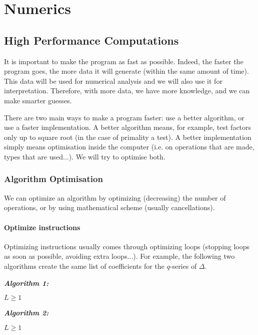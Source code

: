 \section{Numerics}
\subsection{High Performance Computations}
It is important to make the program as fast as possible.
Indeed, the faster the program goes, the more data it will generate (within the same amount of time).
This data will be used for numerical analysis and we will also use it for interpretation.
Therefore, with more data, we have more knowledge, and we can make smarter guesses.

There are two main ways to make a program faster:
use a better algorithm, or 
use a faster implementation.
A better algorithm means, for example, test factors only up to square root (in the case of primality a test).
A better implementation simply means optimisation inside the computer (i.e. on operations that are made, types that are used...).
We will try to optimise both.

\subsubsection{Algorithm Optimisation}
\label{algorithmOptimisation}
We can optimize an algorithm by optimizing (decreasing) the number of operations, or by using mathematical scheme (usually cancellations).
\paragraph{Optimize instructions}
Optimizing instructions usually comes through optimizing loops (stopping loops as soon as possible, avoiding extra loops...).
For example, the following two algorithms create the same list of coefficients for the $q$-series of $\Delta$.

\textbf{\textit{Algorithm 1:}}
\begin{algorithmic}
	\color{CodeColor}
	\Require $L \geq 1$
		\EndIf
	\EndWhile
\end{algorithmic}

\textit{\textbf{Algorithm 2:}}
\begin{algorithmic}
	\color{CodeColor}
	\Require $L \geq 1$
	\EndWhile
\end{algorithmic}

